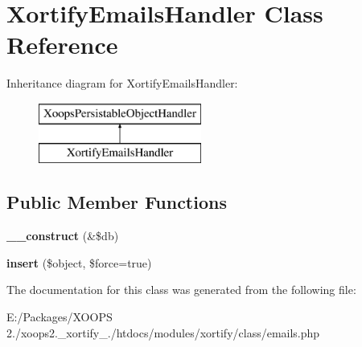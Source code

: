 \hypertarget{class_xortify_emails_handler}{\section{Xortify\-Emails\-Handler Class Reference}
\label{class_xortify_emails_handler}
}
Inheritance diagram for Xortify\-Emails\-Handler\-:\begin{figure}[H]
\begin{center}
\leavevmode
\includegraphics[height=2.000000cm]{class_xortify_emails_handler}
\end{center}
\end{figure}
\subsection*{Public Member Functions}
\begin{DoxyCompactItemize}
\item 
\hypertarget{class_xortify_emails_handler_ad7c6a9d722dfb4ba6ed239adc5ca08f6}{{\bfseries \-\_\-\-\_\-construct} (\&\$db)}\label{class_xortify_emails_handler_ad7c6a9d722dfb4ba6ed239adc5ca08f6}

\item 
\hypertarget{class_xortify_emails_handler_a353f7f972c3884017b9f62093b4f6c59}{{\bfseries insert} (\$object, \$force=true)}\label{class_xortify_emails_handler_a353f7f972c3884017b9f62093b4f6c59}

\end{DoxyCompactItemize}


The documentation for this class was generated from the following file\-:\begin{DoxyCompactItemize}
\item 
E\-:/\-Packages/\-X\-O\-O\-P\-S 2./xoops2.\-\_\-xortify\-\_./htdocs/modules/xortify/class/emails.\-php\end{DoxyCompactItemize}
